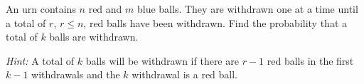 \begin{problem}[Ross, \S 2, \# 19]
  An urn contains \(n\) red and \(m\) blue balls. They are withdrawn one at
  a time until a total of \(r\), \(r\leq n\), red balls have been
  withdrawn. Find the probability that a total of \(k\) balls are
  withdrawn.

  \noindent\emph{Hint:} A total of \(k\) balls will be withdrawn if there are \(r-1\)
  red balls in the first \(k-1\) withdrawals and the \(k\)
  withdrawal is a red ball.
\end{problem}
\begin{solution*}
\end{solution*}

